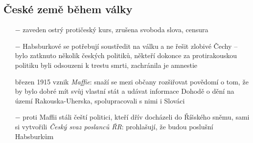 \documentclass{article}
\begin{document}
\subsection*{České země během války}
\begin{itemize}
    \vspace{-0.5em}
    \setlength\itemsep{0.15em}
    \item[$-$] zaveden ostrý protičeský kurs, zrušena svoboda slova, censura
    \item[$-$] Habsburkové se potřebují soustředit na válku a ne řešit zlobivé Čechy -- bylo zatknuto několik českých politiků, někteří dokonce za protirakouskou politiku byli odsouzeni k trestu smrti, zachránila je amnestie
    \item[březen 1915] vznik \textit{Maffie}: snaží se mezi občany rozšiřovat povědomí o tom, že by bylo dobré mít svůj vlastní stát a udávat informace Dohodě o dění na území Rakouska-Uherska, spolupracovali s nimi i Slováci
    \item[$-$] proti Maffii stáli čeští politici, kteří dřív docházeli do Říšského sněmu, sami si vytvořili \textit{Český svaz poslanců ŘR}: prohlašují, že budou poslušní Habsburkům
\end{itemize}
\end{document}
